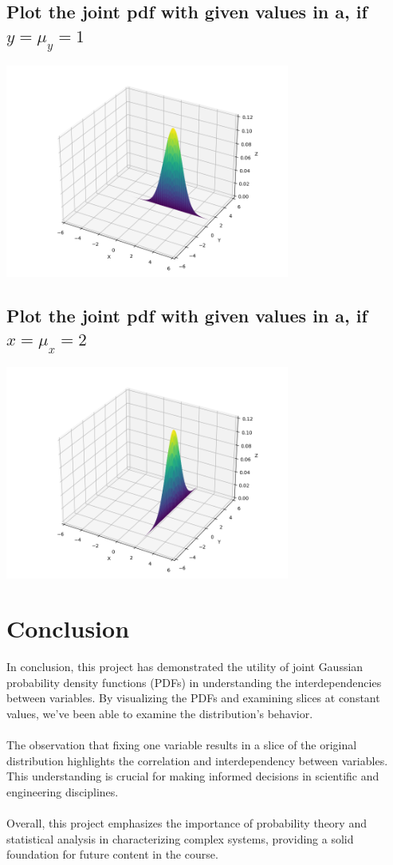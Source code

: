 \documentclass[12pt]{article}
\begin{document}
\boldmath
\subsection{Plot the joint pdf with given values in a, if $y=\mu_y=1$}
\unboldmath

\includegraphics[width=0.7\textwidth]{./pdf-2.png}

\boldmath
\subsection{Plot the joint pdf with given values in a, if $x=\mu_x=2$}
\unboldmath

\includegraphics[width=0.7\textwidth]{./pdf-3.png}

\section{Conclusion}

In conclusion, this project has demonstrated the utility of joint Gaussian probability
density functions (PDFs) in understanding the interdependencies between variables.
By visualizing the PDFs and examining slices at constant values, we've been able to
examine the distribution's behavior. \\ \\
The observation that fixing one variable results in a slice of the original distribution
highlights the correlation and interdependency between variables. This understanding
is crucial for making informed decisions in scientific and engineering disciplines. \\ \\
Overall, this project emphasizes the importance of probability theory and statistical
analysis in characterizing complex systems, providing a solid foundation for future
content in the course.
\end{document}
